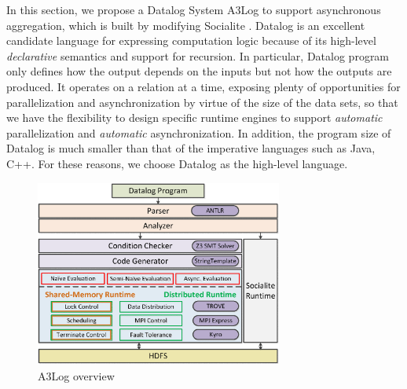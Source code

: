 \documentclass{vldb}
\begin{document}
In this section, we propose a Datalog System A3Log to support asynchronous aggregation, which is built by modifying Socialite \cite{Lam:2013:SDE:2510649.2511289,Seo:2013:DSD:2556549.2556572}. Datalog is an excellent candidate language for expressing computation logic because of its high-level \emph{declarative} semantics and support for recursion. In particular, Datalog program only defines how the output depends on the inputs but not how the outputs are produced. It operates on a relation at a time, exposing plenty of opportunities for parallelization and asynchronization by virtue of the size of the data sets, so that we have the flexibility to design specific runtime engines to support \emph{automatic} parallelization and \emph{automatic} asynchronization. In addition, the program size of Datalog is much smaller than that of the imperative languages such as Java, C++. For these reasons, we choose Datalog as the high-level language.

\begin{figure}[!t]
    \centering
  \includegraphics[width=3.2in]{fig/overview}
  \vspace{-0.1in}
  \caption{A3Log overview}
  \label{fig:overview}
  \vspace{-0.2in}
\end{figure}
\end{document}
